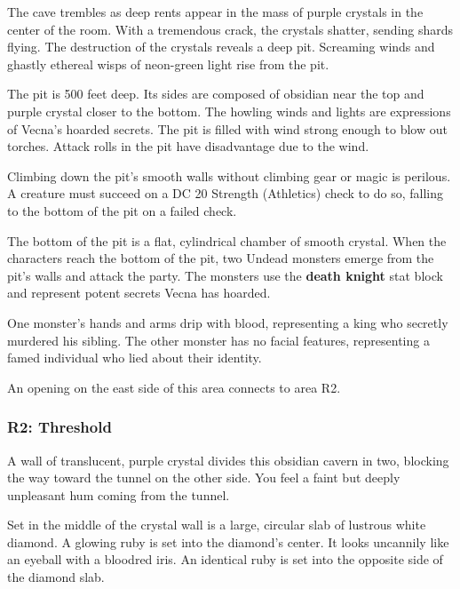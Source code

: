 \documentclass[10pt,a4paper,twoside,bg=print,twocolumn,openany,nodeprecatedcode]{dndbook}
\begin{document}
\begin{DndReadAloud}{}
The cave trembles as deep rents appear in the mass of purple crystals in the center of the room. With a tremendous crack, the crystals shatter, sending shards flying. The destruction of the crystals reveals a deep pit. Screaming winds and ghastly ethereal wisps of neon-green light rise from the pit.

\end{DndReadAloud}

The pit is 500 feet deep. Its sides are composed of obsidian near the top and purple crystal closer to the bottom. The howling winds and lights are expressions of Vecna's hoarded secrets. The pit is filled with wind strong enough to blow out torches. Attack rolls in the pit have disadvantage due to the wind.

Climbing down the pit's smooth walls without climbing gear or magic is perilous. A creature must succeed on a DC 20 Strength (Athletics) check to do so, falling to the bottom of the pit on a failed check.

The bottom of the pit is a flat, cylindrical chamber of smooth crystal. When the characters reach the bottom of the pit, two Undead monsters emerge from the pit's walls and attack the party. The monsters use the \textbf{death knight} stat block and represent potent secrets Vecna has hoarded.

One monster's hands and arms drip with blood, representing a king who secretly murdered his sibling. The other monster has no facial features, representing a famed individual who lied about their identity.

An opening on the east side of this area connects to area R2.

\subsubsection{R2: Threshold}
\begin{DndReadAloud}{}
A wall of translucent, purple crystal divides this obsidian cavern in two, blocking the way toward the tunnel on the other side. You feel a faint but deeply unpleasant hum coming from the tunnel.

Set in the middle of the crystal wall is a large, circular slab of lustrous white diamond. A glowing ruby is set into the diamond's center. It looks uncannily like an eyeball with a bloodred iris. An identical ruby is set into the opposite side of the diamond slab.

\end{DndReadAloud}
\end{document}
